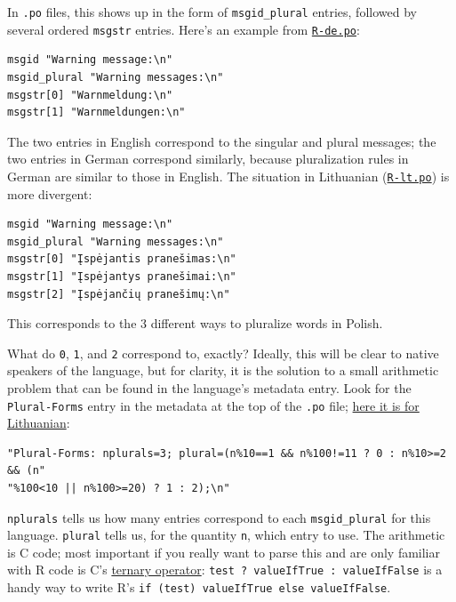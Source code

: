 \documentclass[
]{book}
\begin{document}
In \texttt{.po} files, this shows up in the form of \texttt{msgid\_plural} entries, followed by several ordered \texttt{msgstr} entries. Here's an example from
\href{https://github.com/r-devel/r-svn/blob/c715d61cb74b3fee2d035faed9b258e86e420b75/src/library/base/po/R-de.po\#L2015-L2018}{\texttt{R-de.po}}:

\begin{verbatim}
msgid "Warning message:\n"
msgid_plural "Warning messages:\n"
msgstr[0] "Warnmeldung:\n"
msgstr[1] "Warnmeldungen:\n"
\end{verbatim}

The two entries in English correspond to the singular and plural messages; the two entries in German correspond similarly, because
pluralization rules in German are similar to those in English. The situation in Lithuanian
(\href{https://github.com/r-devel/r-svn/blob/c715d61cb74b3fee2d035faed9b258e86e420b75/src/library/base/po/R-lt.po\#L1999-L2003}{\texttt{R-lt.po}})
is more divergent:

\begin{verbatim}
msgid "Warning message:\n"
msgid_plural "Warning messages:\n"
msgstr[0] "Įspėjantis pranešimas:\n"
msgstr[1] "Įspėjantys pranešimai:\n"
msgstr[2] "Įspėjančių pranešimų:\n"
\end{verbatim}

This corresponds to the 3 different ways to pluralize words in Polish.

What do \texttt{0}, \texttt{1}, and \texttt{2} correspond to, exactly? Ideally, this will be clear to native speakers of the language, but for
clarity, it is the solution to a small arithmetic problem that can be found in the language's metadata entry. Look for the
\texttt{Plural-Forms} entry in the metadata at the top of the \texttt{.po} file;
\href{https://github.com/r-devel/r-svn/blob/c715d61cb74b3fee2d035faed9b258e86e420b75/src/library/base/po/R-lt.po\#L18-L19}{here it is for Lithuanian}:

\begin{verbatim}
"Plural-Forms: nplurals=3; plural=(n%10==1 && n%100!=11 ? 0 : n%10>=2 && (n"
"%100<10 || n%100>=20) ? 1 : 2);\n"
\end{verbatim}

\texttt{nplurals} tells us how many entries correspond to each \texttt{msgid\_plural} for this language. \texttt{plural} tells us, for the
quantity \texttt{n}, which entry to use. The arithmetic is C code; most important if you really want to parse this and are only
familiar with R code is C's \href{https://en.wikipedia.org/wiki/\%3F:}{ternary operator}: \texttt{test\ ?\ valueIfTrue\ :\ valueIfFalse}
is a handy way to write R's \texttt{if\ (test)\ valueIfTrue\ else\ valueIfFalse}.
\end{document}
